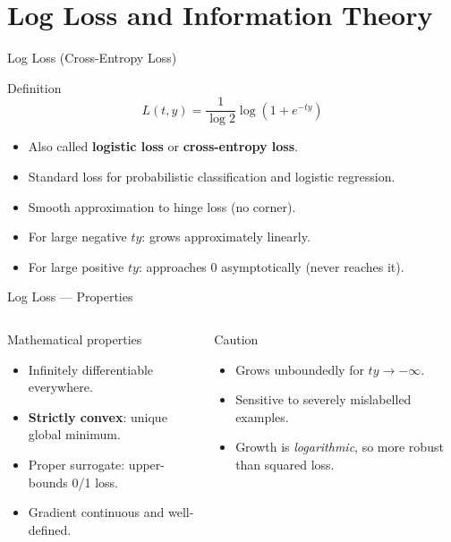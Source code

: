 \section{Log Loss and Information Theory}

\begin{frame}{Log Loss (Cross-Entropy Loss)}
  \begin{block}{Definition}
    \[
      L(t,y) = \frac{1}{\log 2}\log\!\left(1+e^{-ty}\right)
    \]
  \end{block}

  \begin{itemize}
    \item Also called \textbf{logistic loss} or \textbf{cross-entropy loss}.
    \item Standard loss for probabilistic classification and logistic regression.
    \item Smooth approximation to hinge loss (no corner).
    \item For large negative $ty$: grows approximately linearly.
    \item For large positive $ty$: approaches 0 asymptotically (never reaches it).
  \end{itemize}
\end{frame}

\begin{frame}{Log Loss — Properties}
  \begin{columns}[T]
    \begin{block}{Mathematical properties}
      \begin{itemize}
        \item Infinitely differentiable everywhere.
        \item \textbf{Strictly convex}: unique global minimum.
        \item Proper surrogate: upper-bounds 0/1 loss.
        \item Gradient continuous and well-defined.
      \end{itemize}
    \end{block}
    \begin{alertblock}{Caution}
      \begin{itemize}
        \item Grows unboundedly for $ty\to-\infty$.
        \item Sensitive to severely mislabelled examples.
        \item Growth is \emph{logarithmic}, so more robust than squared loss.
      \end{itemize}
    \end{alertblock}
  \end{columns}
\end{frame}

